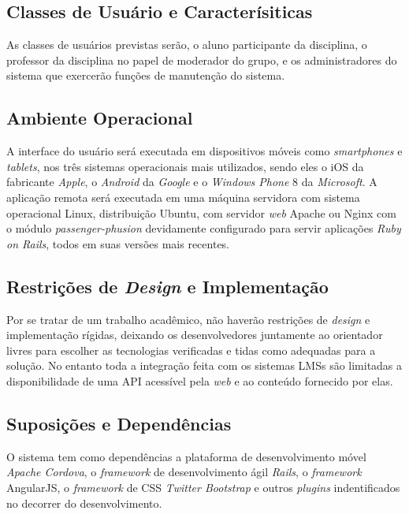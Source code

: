 \subsection{Classes de Usuário e Caracterísiticas}

As classes de usuários previstas serão, o aluno participante da disciplina, o professor da disciplina no papel de moderador do grupo, e os administradores do sistema que exercerão funções de manutenção do sistema. 

\subsection{Ambiente Operacional}

A interface do usuário será executada em dispositivos móveis como \textit{smartphones} e \textit{tablets}, nos três sistemas operacionais mais utilizados, sendo eles o iOS da fabricante \textit{Apple}, o \textit{Android} da \textit{Google} e o \textit{Windows Phone} 8 da \textit{Microsoft}.
A aplicação remota será executada em uma máquina servidora com sistema operacional Linux, distribuição Ubuntu, com servidor \textit{web} Apache ou Nginx com o módulo \textit{passenger-phusion} devidamente configurado para servir aplicações \textit{Ruby on Rails}, todos em suas versões mais recentes.

\subsection{Restrições de \textit{Design} e Implementação}
Por se tratar de um trabalho acadêmico,  não haverão restrições de \textit{design} e implementação rígidas, deixando os desenvolvedores juntamente ao orientador livres para escolher as tecnologias verificadas e tidas como adequadas para a solução. No entanto toda a integração feita com os sistemas LMSs são limitadas a disponibilidade de uma API acessível pela \textit{web} e ao conteúdo fornecido por elas. 

\subsection{Suposições e Dependências}

O sistema tem como dependências a plataforma de desenvolvimento móvel \textit{Apache Cordova}, o \textit{framework} de desenvolvimento ágil \textit{Rails}, o \textit{framework} AngularJS, o \textit{framework} de CSS \textit{Twitter Bootstrap} e outros \textit{plugins} indentificados no decorrer do desenvolvimento.

